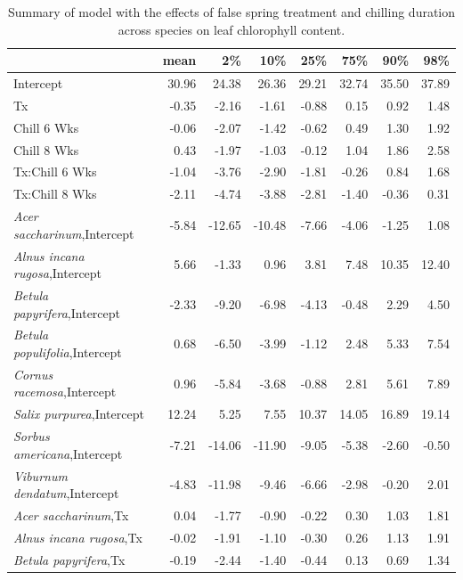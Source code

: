 \documentclass{article}\usepackage[]{graphicx}\usepackage[]{color}
\begin{document}
  \newpage
\begin{longtable}{lrrrrrrr}
\caption{Summary of model with the effects of false spring treatment and chilling duration across species on leaf chlorophyll content.} \\ 
  \hline
 & mean & 2\% & 10\% & 25\% & 75\% & 90\% & 98\% \\ 
  \hline \endhead  \hline
Intercept & 30.96 & 24.38 & 26.36 & 29.21 & 32.74 & 35.50 & 37.89 \\ 
  Tx & -0.35 & -2.16 & -1.61 & -0.88 & 0.15 & 0.92 & 1.48 \\ 
  Chill 6 Wks & -0.06 & -2.07 & -1.42 & -0.62 & 0.49 & 1.30 & 1.92 \\ 
  Chill 8 Wks & 0.43 & -1.97 & -1.03 & -0.12 & 1.04 & 1.86 & 2.58 \\ 
  Tx:Chill 6 Wks & -1.04 & -3.76 & -2.90 & -1.81 & -0.26 & 0.84 & 1.68 \\ 
  Tx:Chill 8 Wks & -2.11 & -4.74 & -3.88 & -2.81 & -1.40 & -0.36 & 0.31 \\ 
  \textit{Acer saccharinum},Intercept & -5.84 & -12.65 & -10.48 & -7.66 & -4.06 & -1.25 & 1.08 \\ 
  \textit{Alnus incana rugosa},Intercept & 5.66 & -1.33 & 0.96 & 3.81 & 7.48 & 10.35 & 12.40 \\ 
  \textit{Betula papyrifera},Intercept & -2.33 & -9.20 & -6.98 & -4.13 & -0.48 & 2.29 & 4.50 \\ 
  \textit{Betula populifolia},Intercept & 0.68 & -6.50 & -3.99 & -1.12 & 2.48 & 5.33 & 7.54 \\ 
  \textit{Cornus racemosa},Intercept & 0.96 & -5.84 & -3.68 & -0.88 & 2.81 & 5.61 & 7.89 \\ 
  \textit{Salix purpurea},Intercept & 12.24 & 5.25 & 7.55 & 10.37 & 14.05 & 16.89 & 19.14 \\ 
  \textit{Sorbus americana},Intercept & -7.21 & -14.06 & -11.90 & -9.05 & -5.38 & -2.60 & -0.50 \\ 
  \textit{Viburnum dendatum},Intercept & -4.83 & -11.98 & -9.46 & -6.66 & -2.98 & -0.20 & 2.01 \\ 
  \textit{Acer saccharinum},Tx & 0.04 & -1.77 & -0.90 & -0.22 & 0.30 & 1.03 & 1.81 \\ 
  \textit{Alnus incana rugosa},Tx & -0.02 & -1.91 & -1.10 & -0.30 & 0.26 & 1.13 & 1.91 \\ 
  \textit{Betula papyrifera},Tx & -0.19 & -2.44 & -1.40 & -0.44 & 0.13 & 0.69 & 1.34 \\ 

\end{longtable}
\end{document}
